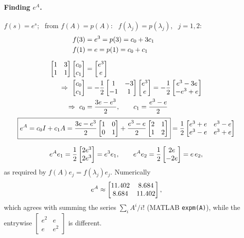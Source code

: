 \begin{example}
\paragraph{Finding $e^A$.} $f(s) = e^s$; \ from $f(A) = p(A)$: \ $f(\lambda_j) = p(\lambda_j)$, \ $j = 1,2$:
\begin{align*}
f(3) &= e^3 = p(3) = c_0 + 3c_1\\
f(1) &= e = p(1) = c_0 + c_1\\[6pt]
\begin{bmatrix}1&3\\1&1\end{bmatrix}\begin{bmatrix}c_0\\c_1\end{bmatrix} &= \begin{bmatrix}e^3\\e\end{bmatrix}\\
\Rightarrow\ \begin{bmatrix}c_0\\c_1\end{bmatrix} &= -\frac12\begin{bmatrix}1&-3\\-1&1\end{bmatrix}\begin{bmatrix}e^3\\e\end{bmatrix}
= -\frac12\begin{bmatrix}e^3-3e\\-e^3+e\end{bmatrix}\\
\Rightarrow\ c_0 &= \frac{3e-e^3}{2}, \qquad c_1 = \frac{e^3-e}{2}
\end{align*}
\[
\boxed{e^A = c_0I + c_1A = \frac{3e-e^3}{2}\begin{bmatrix}1&0\\0&1\end{bmatrix} + \frac{e^3-e}{2}\begin{bmatrix}2&1\\1&2\end{bmatrix}}
= \frac12\begin{bmatrix}e^3+e & e^3-e\\ e^3-e & e^3+e\end{bmatrix}
\]
\begin{insight}[Check]
\[
e^A e_1 = \frac12\begin{bmatrix}2e^3\\2e^3\end{bmatrix}=e^3e_1, \qquad e^Ae_2=\frac12\begin{bmatrix}2e\\-2e\end{bmatrix}=e\,e_2,
\]
as required by $f(A)e_j=f(\lambda_j)e_j$. Numerically
\[
e^A\approx\begin{bmatrix}11.402 & 8.684\\ 8.684 & 11.402\end{bmatrix},
\]
which agrees with summing the series $\sum_i A^i/i!$ (MATLAB \texttt{expm(A)}), while the entrywise $\left[\begin{smallmatrix}e^2&e\\e&e^2\end{smallmatrix}\right]$ is different.
\end{insight}


\end{example}
